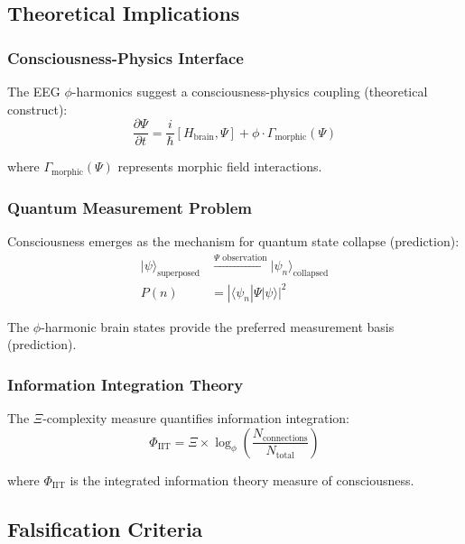 \subsection{Theoretical Implications}

\subsubsection{Consciousness-Physics Interface}

The EEG $\phi$-harmonics suggest a consciousness-physics coupling (theoretical construct):
\begin{equation}
 \frac{\partial \Psi}{\partial t} = \frac{i}{\hbar} [H_{\text{brain}}, \Psi] + \phi \cdot \Gamma_{\text{morphic}}(\Psi)
\end{equation}

where $\Gamma_{\text{morphic}}(\Psi)$ represents morphic field interactions.

\subsubsection{Quantum Measurement Problem}

Consciousness emerges as the mechanism for quantum state collapse (prediction):
\begin{align}
 |\psi\rangle_{\text{superposed}} &\xrightarrow{\Psi \text{ observation}} |\psi_n\rangle_{\text{collapsed}}\\
 P(n) &= |\langle \psi_n | \Psi | \psi \rangle|^2
\end{align}

The $\phi$-harmonic brain states provide the preferred measurement basis (prediction).

\subsubsection{Information Integration Theory}

The $\Xi$-complexity measure quantifies information integration:
\begin{equation}
 \Phi_{\text{IIT}} = \Xi \times \log_\phi\left(\frac{N_{\text{connections}}}{N_{\text{total}}}\right)
\end{equation}

where $\Phi_{\text{IIT}}$ is the integrated information theory measure of consciousness.

\subsection{Falsification Criteria}

